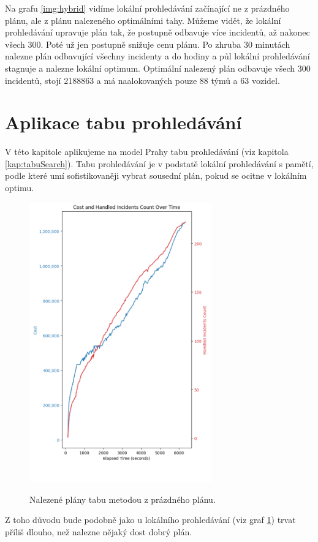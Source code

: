 Na grafu \ref{img:hybrid} vidíme lokální prohledávání začínající ne z prázdného plánu, ale z plánu nalezeného optimálními tahy.
Můžeme vidět, že lokální prohledávání upravuje plán tak, že postupně odbavuje více incidentů, až nakonec všech 300. Poté už jen postupně snižuje cenu plánu.
Po zhruba 30 minutách nalezne plán odbavující všechny incidenty a do hodiny a půl lokální prohledávání stagnuje a nalezne lokální optimum.
Optimální nalezený plán odbavuje všech 300 incidentů, stojí 2188863 a má naalokovaných pouze 88 týmů a 63 vozidel.

\section{Aplikace tabu prohledávání}

V této kapitole aplikujeme na model Prahy tabu prohledávání (viz kapitola \ref{kap:tabuSearch}).
Tabu prohledávání je v podstatě lokální prohledávání s pamětí, podle které umí sofistikovaněji vybrat sousední plán,
pokud se ocitne v lokálním optimu.

\begin{figure}[H]
  \caption{Nalezené plány tabu metodou z prázdného plánu.}
  \includegraphics[width=0.7\textwidth,height=0.9\textwidth]{img/plots/tabuSearch_empty.png}
  \centering
  \label{img:empty_tabu}
\end{figure}

Z toho důvodu bude podobně jako u lokálního prohledávání (viz graf \ref{img:empty_tabu}) trvat příliš dlouho, než nalezne nějaký dost dobrý plán.

